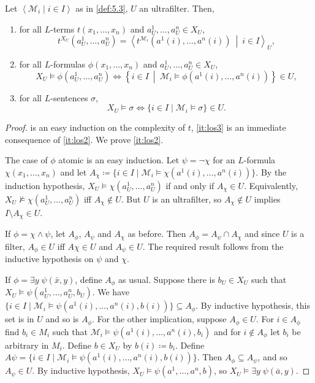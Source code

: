 \documentclass{article}
\let\models\vDash
\begin{document}
\begin{nthm}[Łoś] \label{thm:5.7} 
Let $\left< \mathcal{M}_i \mid i \in I \right>$ as in \cref{def:5.3}, $U$ an ultrafilter. Then,
\begin{enumerate}[label=(\roman*)]
\item for all $L$-terms $t(x_1, \dots, x_n)$ and $a_U^1, \dots, a_U^n \in X_U$, \label{it:los1}
\[
t^{X_U}(a_U^1, \dots, a_U^n) = \left< t^{\mathcal{M}_i} (a^1(i), \dots, a^n(i)) \ \middle|\ i \in I \right>_U,
\] 
\item for all $L$-formulas $\phi(x_1, \dots, x_n)$ and $a_U^1, \dots, a_U^n \in X_U$, \label{it:los2}
\[
X_U \models \phi(a_U^1, \dots, a_U^n) \iff \left\{ i \in I \ \middle|\ \mathcal{M}_i \models \phi(a^1(i), \dots,  a^n(i)) \right\} \in U,
\] 
\item for all $L$-sentences $\sigma$,  \label{it:los3}
\[
X_U \models \sigma \iff \{i \in I \mid \mathcal{M}_i \models \sigma \} \in U.
\] 
\end{enumerate}
\end{nthm}
\begin{proof}
 is an easy induction on the complexity of $t$, \cref{it:los3} is an immediate consequence of \cref{it:los2}. We prove \cref{it:los2}.

The case of $\phi$ atomic is an easy induction. Let $\psi = \neg \chi$ for an $L$-formula $\chi(x_1, \dots, x_n)$ and let $A_\chi \coloneqq \{i \in I \mid \mathcal{M}_i \models \chi(a^1(i), \dots, a^n(i))\}$. By the induction hypothesis, $X_U \models \chi(a_U^1, \dots, a_U^n)$ if and only if $A_\chi \in U$. Equivalently, $X_U \not\models \chi(a_U^1, \dots, a_U^n)$ iff $A_\chi \not\in U$. But $U$ is an ultrafilter, so $A_\chi \not\in U$ implies $I \setminus A_\chi \in U$.

If $\phi = \chi \land \psi$, let $A_\phi$, $A_\psi$ and $A_\chi$ as before. Then $A_\phi = A_\psi \cap A_\chi$ and since $U$ is a filter, $A_\phi \in U$ iff $A\chi \in U$ and $A_\psi \in U$. The required result follows from the inductive hypothesis on $\psi$ and $\chi$.

If $\phi = \exists y \; \psi(\bar x, y)$, define $A_\phi$ as usual. Suppose there is $b_U \in X_U$ such that $X_U \models \psi(a_U^1, \dots, a_U^n, b_U)$. We have $\{i \in I \mid \mathcal{M}_i \models \psi(a^1(i), \dots, a^n(i),b(i))\} \subseteq A_\phi$. By inductive hypothesis, this set is in $U$ and so is $A_\phi$. For the other implication, suppose $A_\phi \in U$. For $i \in A_\phi$ find $b_i \in M_i$ such that $\mathcal{M}_i \models \psi(a^1(i), \dots, a^n(i), b_i)$ and for $i \not\in A_\phi$ let $b_i$ be arbitrary in $M_i$. Define $b \in X_U$ by $b(i) \coloneqq b_i$. Define $A \psi = \{i \in I \mid \mathcal{M}_i \models \psi(a^1(i), \dots, a^n(i),b(i))\}$. Then $A_\phi \subseteq A_\psi$, and so $A_\psi \in U$. By inductive hypothesis, $X_U \models  \psi(a^1, \dots, a^n, b)$, so $X_U \models \exists y \; \psi(\bar a, y)$.
\end{proof}
\end{document}
